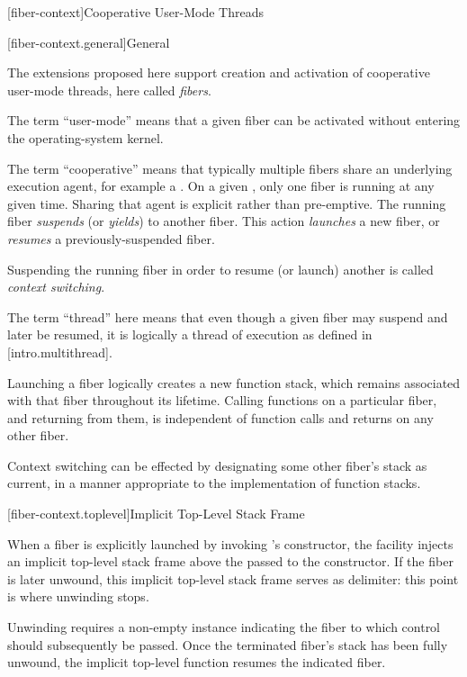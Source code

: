 \newpage

\setcounter{section}{33}
\setcounter{subsection}{6}

\label{api}

[fiber-context]{Cooperative User-Mode Threads}

[fiber-context.general]{General}

The extensions proposed here support creation and activation of cooperative
user-mode threads, here called \emph{fibers}.

The term ``user-mode'' means that a given fiber can be activated without
entering the operating-system kernel.

The term ``cooperative'' means that typically multiple fibers share an
underlying execution agent, for example a . On a
given , only one fiber is running at any given time. Sharing
that agent is explicit rather than pre-emptive. The running
fiber \emph{suspends} (or \emph{yields}) to another fiber. This
action \emph{launches} a new fiber, or \emph{resumes} a previously-suspended
fiber.

Suspending the running fiber in order to resume (or launch) another is
called \emph{context switching}.

The term ``thread'' here means that even though a given fiber may suspend and
later be resumed, it is logically a thread of execution as defined in
[intro.multithread].

Launching a fiber logically creates a new function stack, which remains
associated with that fiber throughout its lifetime. Calling functions on a
particular fiber, and returning from them, is independent of function calls
and returns on any other fiber.

Context switching can be effected by designating some other fiber's stack as
current, in a manner appropriate to the implementation of function stacks.

[fiber-context.toplevel]{Implicit Top-Level Stack Frame}

When a fiber is explicitly launched by invoking \fiber's constructor, the
facility injects an implicit top-level stack frame above the \entryfn passed to
the constructor. If the fiber is later unwound, this implicit top-level stack
frame serves as delimiter: this point is where unwinding stops.

Unwinding requires a non-empty \fiber instance indicating the fiber to which
control should subsequently be passed. Once the terminated fiber's stack has
been fully unwound, the implicit top-level function resumes the indicated fiber.


